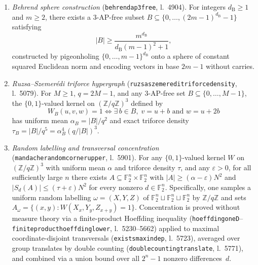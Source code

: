 \documentclass[11pt,reqno]{amsart}
\theoremstyle{remark}
\newcommand{\F}{\mathbb{F}}
\newcommand{\Z}{\mathbb{Z}}
\newcommand{\LeanUS}{\textunderscore\hspace{0pt}}
\newcommand{\lean}[1]{{\let\_\LeanUS\texttt{#1}}}
\begin{document}
\begin{enumerate}[label=(L\arabic*),leftmargin=2.6em]
\item \emph{Behrend sphere construction} (\lean{behrend\_ap3\_free}, l.~4904). For integers $d_{\mathrm{B}} \ge 1$ and $m \ge 2$, there exists a $3$-AP-free subset $B \subseteq \{0, \dots, (2m - 1)^{d_{\mathrm{B}}} - 1\}$ satisfying
\[
  |B| \ge \frac{m^{d_{\mathrm{B}}}}{d_{\mathrm{B}}(m - 1)^2 + 1},
\]
constructed by pigeonholing $\{0, \dots, m - 1\}^{d_{\mathrm{B}}}$ onto a sphere of constant squared Euclidean norm and encoding vectors in base $2m - 1$ without carries.
\item \emph{Ruzsa--Szemer\'edi triforce hypergraph} (\lean{ruzsa\_szemeredi\_triforce\_density}, l.~5079). For $M \ge 1$, $q = 2M - 1$, and any $3$-AP-free set $B \subseteq \{0, \dots, M - 1\}$, the $\{0, 1\}$-valued kernel on $(\Z/q\Z)^3$ defined by
\[
  W_B(u, v, w) = 1 \iff \exists\, b \in B,\; v = u + b \text{ and } w = u + 2b
\]
has uniform mean $\alpha_B = |B| / q^2$ and exact triforce density $\tau_B = |B| / q^5 = \alpha_B^4 (q / |B|)^3$.
\item \emph{Random labelling and transversal concentration} (\lean{mandache\_random\_corner\_upper}, l.~5901). For any $\{0, 1\}$-valued kernel $W$ on $(\Z/q\Z)^3$ with uniform mean $\alpha$ and triforce density $\tau$, and any $\varepsilon > 0$, for all sufficiently large $n$ there exists $A \subseteq \F_2^n \times \F_2^n$ with $|A| \ge (\alpha - \varepsilon) N^2$ and $|S_d(A)| \le (\tau + \varepsilon) N^2$ for every nonzero $d \in \F_2^n$. Specifically, one samples a uniform random labelling $\omega = (X, Y, Z)$ of $\F_2^n \sqcup \F_2^n \sqcup \F_2^n$ by $\Z/q\Z$ and sets $A_\omega = \{(x, y) : W(X_x, Y_y, Z_{x+y}) = 1\}$. Concentration is proved without measure theory via a finite-product Hoeffding inequality (\lean{hoeffding\_oneD}--\lean{finite\_product\_hoeffding\_lower}, l.~5230--5662) applied to maximal coordinate-disjoint transversals (\lean{exists\_max\_indep}, l.~5723), averaged over group translates by double counting (\lean{double\_counting\_translate}, l.~5771), and combined via a union bound over all $2^n - 1$ nonzero differences~$d$.
\end{enumerate}
\end{document}
